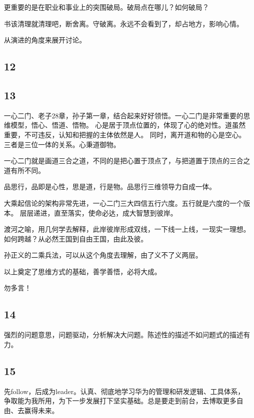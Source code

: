 更重要的是在职业和事业上的突围破局。破局点在哪儿？如何破局？

书该清理就清理吧，断舍离。守破离。永远不会看到了，却占地方，影响心情。

\hrulefill

从演进的角度来展开讨论。

\subsection{12}

\subsection{13}

一心二门、老子28章，孙子第一章，结合起来好好领悟。一心二门是非常重要的思维模型，悟心、悟道、悟物。
心是居于顶点位置的，体现了心的绝对性。道虽然重要，不可违反，认知和把握的主体依然是人。
同时，离开道和物的心是空心。三者是三位一体的关系。心秉道御物。

一心二门就是画道三合之道，不同的是把心置于顶点了，与把道置于顶点的三合之道有所不同。

品思行，品即是心性，思是道，行是物。品思行三维领导力自成一体。

大乘起信论的架构非常先进，一心二门三大四信五行六度。五行就是六度的一个版本。
层层递进，直至落实，使命必达，成大智慧到彼岸。

渡河之喻，用几何学去解释，此岸彼岸形成双线，一下线一上线，一现实一理想。
如何跨越？从必然王国到自由王国，由此及彼。

孙正义的二乘兵法，可以从这个角度去理解，由了义不了义两层。

以上奠定了思维方式的基础，善学善悟，必将大成。

\hrulefill

勿多言！

\subsection{14}

强烈的问题意思，问题驱动，分析解决大问题。陈述性的描述不如问题式的描述有力。

\subsection{15}

先follow，后成为leader。认真、彻底地学习华为的管理和研发逻辑、工具体系，
争取能为我所用，为下一步发展打下坚实基础。总是要走到前台，去博取更多自由、去赢得未来。


